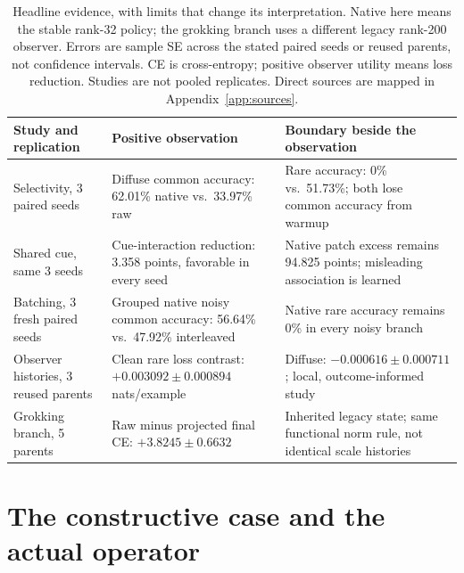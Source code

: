 \documentclass[10pt]{article}
\begin{document}
\begin{table}[t]
\centering\small
\begin{tabular}{>{\raggedright\arraybackslash}p{.24\linewidth}>{\raggedright\arraybackslash}p{.32\linewidth}>{\raggedright\arraybackslash}p{.35\linewidth}}
\toprule
Study and replication & Positive observation & Boundary beside the observation\\\midrule
Selectivity, 3 paired seeds & Diffuse common accuracy: 62.01\% native vs.\ 33.97\% raw & Rare accuracy: 0\% vs.\ 51.73\%; both lose common accuracy from warmup\\
Shared cue, same 3 seeds & Cue-interaction reduction: 3.358 points, favorable in every seed & Native patch excess remains 94.825 points; misleading association is learned\\
Batching, 3 fresh paired seeds & Grouped native noisy common accuracy: 56.64\% vs.\ 47.92\% interleaved & Native rare accuracy remains 0\% in every noisy branch\\
Observer histories, 3 reused parents & Clean rare loss contrast: $+0.003092\pm0.000894$ nats/example & Diffuse: $-0.000616\pm0.000711$; local, outcome-informed study\\
Grokking branch, 5 parents & Raw minus projected final CE: $+3.8245\pm0.6632$ & Inherited legacy state; same functional norm rule, not identical scale histories\\\bottomrule
\end{tabular}
\caption{Headline evidence, with limits that change its interpretation. Native here means the stable rank-32 policy; the grokking branch uses a different legacy rank-200 observer. Errors are sample SE across the stated paired seeds or reused parents, not confidence intervals. CE is cross-entropy; positive observer utility means loss reduction. Studies are not pooled replicates. Direct sources are mapped in Appendix~\ref{app:sources}.}
\label{tab:headline}
\end{table}

\section{The constructive case and the actual operator}
\end{document}
